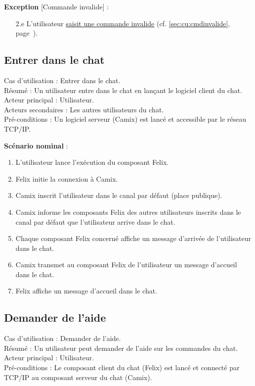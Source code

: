 \medskip
\textbf{Exception} [Commande invalide] :
\begin{enumerate}
\item[2.e] L'utilisateur \underline{saisit une commande invalide} (cf. \ref{sec:cu:cmdinvalide}, page~\pageref{sec:cu:cmdinvalide}).
\end{enumerate}


\subsection{Entrer dans le chat}
\label{sec:cu:entrerchat}

\noindent
Cas d'utilisation : Entrer dans le chat.\\
Résumé : Un utilisateur entre dans le chat en lançant le logiciel client du chat.\\
Acteur principal : Utilisateur.\\
Acteurs secondaires : Les autres utilisateurs du chat.\\
Pré-conditions : Un logiciel serveur (Camix) est lancé et accessible par le réseau TCP/IP.

\medskip
\textbf{Scénario nominal} :
\begin{enumerate}
\item L'utilisateur lance l'exécution du composant Felix.
\item Felix initie la connexion à Camix.
\item Camix inscrit l'utilisateur dans le canal par défaut (place publique).
\item Camix informe les composants Felix des autres utilisateurs inscrits dans le canal par défaut que l'utilisateur arrive dans le chat.
\item Chaque composant Felix concerné affiche un message d'arrivée de l'utilisateur dans le chat.
\item Camix transmet au composant Felix de l'utilisateur un message d'accueil dans le chat.
\item Felix affiche un message d'accueil dans le chat.
\end{enumerate}
 
\subsection{Demander de l'aide}
\label{sec:cu:aide}

\noindent
Cas d'utilisation : Demander de l'aide.\\
Résumé : Un utilisateur peut demander de l'aide sur les commandes du chat. \\
Acteur principal : Utilisateur.\\
Pré-conditions : Le composant client du chat (Felix) est lancé et connecté par TCP/IP au composant serveur du chat (Camix).

